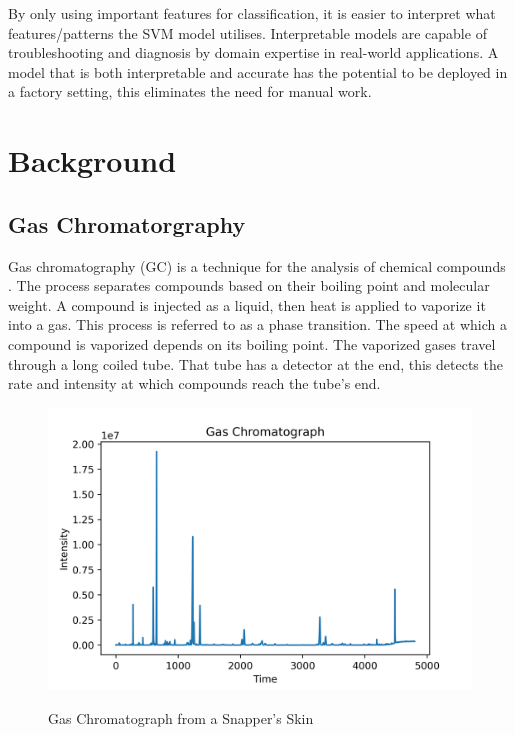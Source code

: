 \documentclass[runningheads]{llncs}
\begin{document}
By only using important features for classification, it is easier to interpret what features/patterns the SVM model utilises. 
Interpretable models are capable of troubleshooting and diagnosis by domain expertise in real-world applications.
A model that is both interpretable and accurate has the potential to be deployed in a factory setting, this eliminates the need for manual work.

\section{Background}
\label{background}

\subsection{Gas Chromatorgraphy}


Gas chromatography (GC) is a technique for the analysis of chemical compounds \cite{eder1995gas,restek2018high}.
The process separates compounds based on their boiling point and molecular weight.
A compound is injected as a liquid, then heat is applied to vaporize it into a gas. 
This process is referred to as a phase transition. 
The speed at which a compound is vaporized depends on its boiling point. 
The vaporized gases travel through a long coiled tube.
That tube has a detector at the end, this detects the rate and intensity at which compounds reach the tube's end. 

\begin{figure}[htb]
  \centering
  \caption{Gas Chromatograph from a Snapper's Skin}
  \includegraphics[width=12.5cm]{chromatograph.png}
  \label{fig:gas-chromatography} 
  \captionsetup[figure]{font=small,labelfont=small}
\end{figure}
\end{document}
